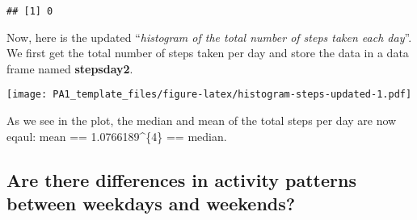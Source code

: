 \documentclass[]{article}
\newenvironment{Shaded}{\begin{snugshade}}{\end{snugshade}}
\newcommand{\KeywordTok}[1]{\textcolor[rgb]{0.13,0.29,0.53}{\textbf{#1}}}
\newcommand{\DataTypeTok}[1]{\textcolor[rgb]{0.13,0.29,0.53}{#1}}
\newcommand{\DecValTok}[1]{\textcolor[rgb]{0.00,0.00,0.81}{#1}}
\newcommand{\StringTok}[1]{\textcolor[rgb]{0.31,0.60,0.02}{#1}}
\newcommand{\CommentTok}[1]{\textcolor[rgb]{0.56,0.35,0.01}{\textit{#1}}}
\newcommand{\OperatorTok}[1]{\textcolor[rgb]{0.81,0.36,0.00}{\textbf{#1}}}
\newcommand{\NormalTok}[1]{#1}
\begin{document}
\begin{verbatim}
## [1] 0
\end{verbatim}

Now, here is the updated ``\emph{histogram of the total number of steps
taken each day}''. We first get the total number of steps taken per day
and store the data in a data frame named \textbf{stepsday2}.

\begin{Shaded}
\end{Shaded}

\texttt{[image: PA1\_template\_files/figure-latex/histogram-steps-updated-1.pdf]}

\begin{Shaded}
\end{Shaded}

As we see in the plot, the median and mean of the total steps per day
are now eqaul: mean == 1.0766189\^{}\{4\} == median.

\subsection{Are there differences in activity patterns between weekdays
and
weekends?}\label{are-there-differences-in-activity-patterns-between-weekdays-and-weekends}
\end{document}
